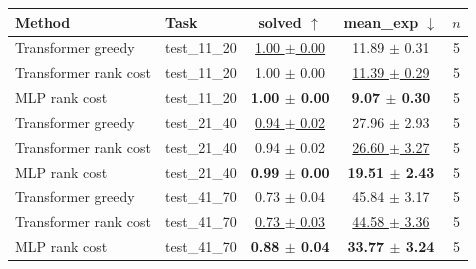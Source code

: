 \begin{tabular}{llccc}
\toprule
Method & Task & solved $\uparrow$ & mean\_exp $\downarrow$ & $n$ \\
\midrule
Transformer greedy & test\_11\_20 & \underline{1.00 $\pm$ 0.00} & 11.89 $\pm$ 0.31 & 5 \\
Transformer rank cost & test\_11\_20 & 1.00 $\pm$ 0.00 & \underline{11.39 $\pm$ 0.29} & 5 \\
MLP rank cost & test\_11\_20 & \textbf{1.00 $\pm$ 0.00} & \textbf{9.07 $\pm$ 0.30} & 5 \\
\midrule
Transformer greedy & test\_21\_40 & \underline{0.94 $\pm$ 0.02} & 27.96 $\pm$ 2.93 & 5 \\
Transformer rank cost & test\_21\_40 & 0.94 $\pm$ 0.02 & \underline{26.60 $\pm$ 3.27} & 5 \\
MLP rank cost & test\_21\_40 & \textbf{0.99 $\pm$ 0.00} & \textbf{19.51 $\pm$ 2.43} & 5 \\
\midrule
Transformer greedy & test\_41\_70 & 0.73 $\pm$ 0.04 & 45.84 $\pm$ 3.17 & 5 \\
Transformer rank cost & test\_41\_70 & \underline{0.73 $\pm$ 0.03} & \underline{44.58 $\pm$ 3.36} & 5 \\
MLP rank cost & test\_41\_70 & \textbf{0.88 $\pm$ 0.04} & \textbf{33.77 $\pm$ 3.24} & 5 \\
\bottomrule
\end{tabular}
